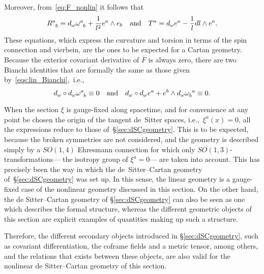 \documentclass[
final,
11pt,
a4paper,
DIV=11,
headinclude=true,
footinclude=false,
bibliography=totoc,
twoside=true,  %
BCOR=5mm
]{scrbook}
\begin{document}
Moreover, from~\eqref{eq:F_nonlin} it follows that
\begin{equation*}
  R\ind{^a_b} = d_\omega \omega\ind{^a_b} + \frac{1}{l^2} e^a 
  \wedge e_b
  \quad\text{and}\quad
  T^a = d_\omega e^a - \frac{1}{l} dl \wedge e^a.
\end{equation*}
These equations, which express the curvature and torsion in terms 
of the spin connection and vierbein, are the ones to be expected 
for a Cartan geometry. Because the exterior covariant derivative 
of $\bar{F}$ is always zero, there are two Bianchi identities 
that are formally the same as those given 
by~\eqref{eqs:lin_Bianchi},~i.e.,
\begin{equation*}
  d_\omega \circ d_\omega \omega\ind{^a_b} \equiv 0
  \quad\text{and}\quad
  d_\omega \circ d_\omega e^a + e^b \wedge d_\omega 
  \omega\ind{_b^a} \equiv 0.
\end{equation*}

When the section $\xi$ is gauge-fixed along spacetime, and for 
convenience at any point be chosen the origin of the tangent 
de~Sitter spaces, i.e.,~$\xi^a(x) = 0$, all the expressions 
reduce to those of~\S\ref{sec:dSCgeometry}.  This is to be 
expected, because the broken symmetries are not considered, and 
the geometry is described simply by a $SO(1,4)$ Ehresmann 
connection for which only $SO(1,3)$-transformations--- the 
isotropy group of $\xi^a =0$--- are taken into account. This has 
precisely been the way in which the de~Sitter--Cartan geometry 
of~\S\ref{sec:dSCgeometry} was set up.  In this sense, the linear 
geometry is a gauge-fixed case of the nonlinear geometry 
discussed in this section. On the other hand, the de 
Sitter--Cartan geometry of \S\ref{sec:dSCgeometry} can also be 
seen as one which describes the formal structure, whereas the 
different geometric objects of this section are explicit examples 
of quantities making up such a structure.

Therefore, the different secondary objects introduced in 
\S\ref{sec:dSCgeometry}, such as covariant differentiation, the
coframe fields and a metric tensor, among others, and the 
relations that exists between these objects, are also valid for 
the nonlinear de Sitter--Cartan geometry of this section.
\end{document}
